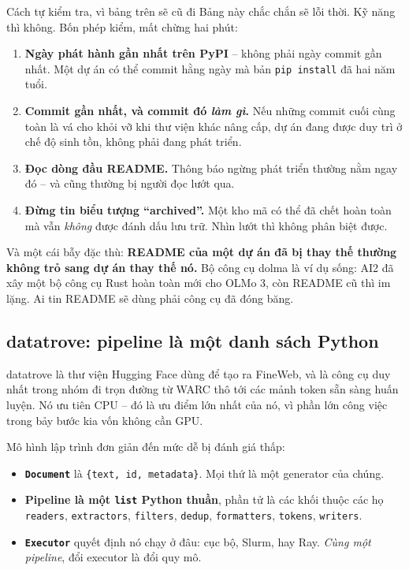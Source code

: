 \begin{deepdive}{Cách tự kiểm tra, vì bảng trên sẽ cũ đi}
Bảng này chắc chắn sẽ lỗi thời. Kỹ năng thì không. Bốn phép kiểm, mất chừng hai phút:
\begin{enumerate}
	\item \textbf{Ngày phát hành gần nhất trên PyPI} -- không phải ngày commit gần nhất. Một dự án có thể commit hằng ngày mà bản \texttt{pip install} đã hai năm tuổi.
	\item \textbf{Commit gần nhất, và commit đó \emph{làm gì}.} Nếu những commit cuối cùng toàn là vá cho khỏi vỡ khi thư viện khác nâng cấp, dự án đang được duy trì ở chế độ sinh tồn, không phải đang phát triển.
	\item \textbf{Đọc dòng đầu README.} Thông báo ngừng phát triển thường nằm ngay đó -- và cũng thường bị người đọc lướt qua.
	\item \textbf{Đừng tin biểu tượng “archived”.} Một kho mã có thể đã chết hoàn toàn mà vẫn \emph{không} được đánh dấu lưu trữ. Nhìn lướt thì không phân biệt được.
\end{enumerate}
Và một cái bẫy đặc thù: \textbf{README của một dự án đã bị thay thế thường không trỏ sang dự án thay thế nó.} Bộ công cụ dolma là ví dụ sống: AI2 đã xây một bộ công cụ Rust hoàn toàn mới cho OLMo 3, còn README cũ thì im lặng. Ai tin README sẽ dùng phải công cụ đã đóng băng.
\end{deepdive}

\subsection{datatrove: pipeline là một danh sách Python}
\label{ssec:datatrove}

datatrove là thư viện Hugging Face dùng để tạo ra FineWeb, và là công cụ duy nhất trong nhóm đi trọn đường từ WARC thô tới các mảnh token sẵn sàng huấn luyện. Nó ưu tiên CPU -- đó là ưu điểm lớn nhất của nó, vì phần lớn công việc trong bảy bước kia vốn không cần GPU.

Mô hình lập trình đơn giản đến mức dễ bị đánh giá thấp:
\begin{itemize}
	\item \textbf{\texttt{Document}} là \texttt{\{text, id, metadata\}}. Mọi thứ là một generator của chúng.
	\item \textbf{Pipeline là một \texttt{list} Python thuần}, phần tử là các khối thuộc các họ \texttt{readers}, \texttt{extractors}, \texttt{filters}, \texttt{dedup}, \texttt{formatters}, \texttt{tokens}, \texttt{writers}.
	\item \textbf{\texttt{Executor}} quyết định nó chạy ở đâu: cục bộ, Slurm, hay Ray. \emph{Cùng một pipeline}, đổi executor là đổi quy mô.
\end{itemize}

